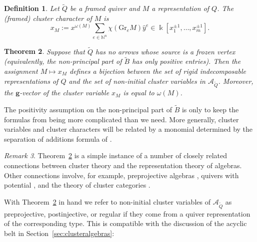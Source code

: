 \documentclass[12pt]{amsart}
\newcommand{\cA}{\mathcal{A}}
\newcommand{\NN}{\mathbb{N}}
\newcommand{\kk}{\Bbbk}
\newcommand{\bfg}{\mathbf{g}}
\newcommand{\gv}{\omega}
\newcommand{\grep}{\gv}
\newcommand{\Gr}{\mathrm{Gr}}
\newtheorem{theorem}{Theorem}[section]
\newtheorem{definition}[theorem]{Definition}
\theoremstyle{remark}
\newtheorem{remark}[theorem]{Remark}
\numberwithin{equation}{section}
\numberwithin{figure}{section}
\begin{document}
\begin{definition}
  Let $\widetilde{Q}$ be a framed quiver and $M$ a representation of $Q$.  The (framed) cluster character of $M$ is
  \begin{equation}
    \label{eq:cc formula}
    x_M := x^{\grep(M)} \sum_{e \in \NN^n}\chi(\Gr_e M) \hat{y}^e \in \kk[x_1^{\pm 1},\dotsc,x_m^{\pm 1}].
  \end{equation}
\end{definition}

\begin{theorem}
  \label{thm:CCbijection}
  \cite{CC06,CK06}
  Suppose that $\widetilde{Q}$ has no arrows whose source is a frozen vertex (equivalently, the non-principal part of $\widetilde{B}$ has only positive entries).
  Then the assignment $M \mapsto x_M$ defines a bijection between the set of rigid indecomposable representations of $Q$ and the set of non-initial cluster variables in $\cA_{\widetilde{Q}}$.
  Moreover, the $\bfg$-vector of the cluster variable $x_M$ is equal to $\grep(M)$.
\end{theorem}

The positivity assumption on the non-principal part of $\widetilde{B}$ is only to keep the formulas from being more complicated than we need.
More generally, cluster variables and cluster characters will be related by a monomial determined by the separation of additions formula of \cite{FZ07}.

\begin{remark}
  Theorem~\ref{thm:CCbijection} is a simple instance of a number of closely related connections between cluster theory and the representation theory of algebras.
  Other connections involve, for example, preprojective algebras \cite{GLS13}, quivers with potential \cite{DWZ10}, and the theory of cluster categories \cite{BMRRT06}.
\end{remark}

With Theorem~\ref{thm:CCbijection} in hand we refer to non-initial cluster variables of $\cA_{\widetilde{Q}}$ as preprojective, postinjective, or regular if they come from a quiver representation of the corresponding type.
This is compatible with the discussion of the acyclic belt in Section~\ref{sec:clusteralgebras}:
\end{document}
